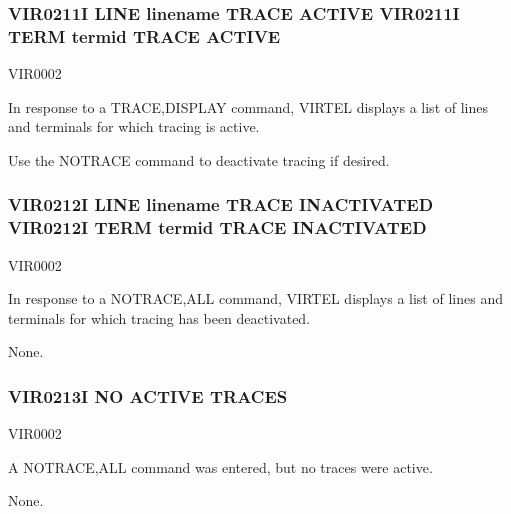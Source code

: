 \documentclass[letterpaper,10pt,english]{sphinxmanual}
\begin{document}
\subsubsection{VIR0211I LINE linename TRACE ACTIVE VIR0211I TERM termid TRACE ACTIVE}
\label{\detokenize{messages:vir0211i-line-linename-trace-active-vir0211i-term-termid-trace-active}}\begin{description}
\sphinxAtStartPar
VIR0002

\sphinxAtStartPar
In response to a TRACE,DISPLAY command, VIRTEL displays a list of lines and terminals for which tracing is active.

\sphinxAtStartPar
Use the NOTRACE command to deactivate tracing if desired.

\end{description}


\subsubsection{VIR0212I LINE linename TRACE INACTIVATED VIR0212I TERM termid TRACE INACTIVATED}
\label{\detokenize{messages:vir0212i-line-linename-trace-inactivated-vir0212i-term-termid-trace-inactivated}}\begin{description}
\sphinxAtStartPar
VIR0002

\sphinxAtStartPar
In response to a NOTRACE,ALL command, VIRTEL displays a list of lines and terminals for which tracing has been deactivated.

\sphinxAtStartPar
None.

\end{description}


\subsubsection{VIR0213I NO ACTIVE TRACES}
\label{\detokenize{messages:vir0213i-no-active-traces}}\begin{description}
\sphinxAtStartPar
VIR0002

\sphinxAtStartPar
A NOTRACE,ALL command was entered, but no traces were active.

\sphinxAtStartPar
None.

\end{description}
\end{document}
